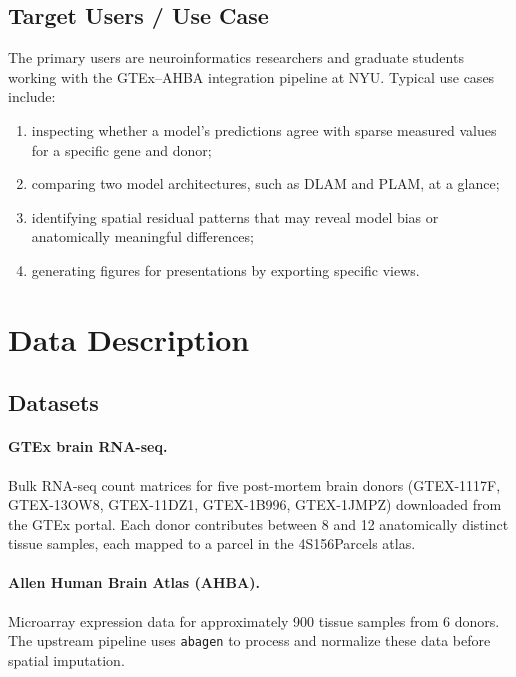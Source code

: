 \documentclass[11pt,letterpaper]{article}
\begin{document}
\subsection{Target Users / Use Case}

The primary users are neuroinformatics researchers and graduate students working with the GTEx--AHBA integration pipeline at NYU.
Typical use cases include:
\begin{enumerate}[nosep]
  \item inspecting whether a model's predictions agree with sparse measured values for a specific gene and donor;
  \item comparing two model architectures, such as DLAM and PLAM, at a glance;
  \item identifying spatial residual patterns that may reveal model bias or
        anatomically meaningful differences;
  \item generating figures for presentations by exporting specific views.
\end{enumerate}

\section{Data Description}
\label{sec:data}

\subsection{Datasets}

\paragraph{GTEx brain RNA-seq.}
Bulk RNA-seq count matrices for five post-mortem brain donors
(GTEX-1117F, GTEX-13OW8, GTEX-11DZ1, GTEX-1B996, GTEX-1JMPZ)
downloaded from the GTEx portal.
Each donor contributes between 8 and 12 anatomically distinct tissue samples,
each mapped to a parcel in the 4S156Parcels atlas.

\paragraph{Allen Human Brain Atlas (AHBA).}
Microarray expression data for approximately 900 tissue samples from 6 donors.
The upstream pipeline uses \texttt{abagen} to process and normalize these
data before spatial imputation.
\end{document}
